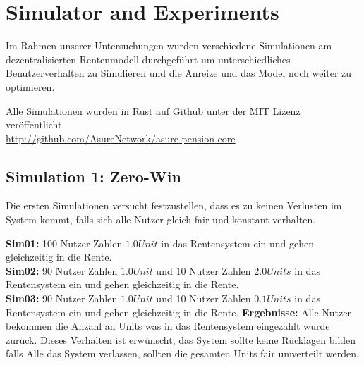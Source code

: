 \section{Simulator and Experiments}

Im Rahmen unserer Untersuchungen wurden verschiedene Simulationen am dezentralisierten Rentenmodell durchgeführt um unterschiedliches Benutzerverhalten zu Simulieren und die Anreize und das Model noch weiter zu optimieren.

Alle Simulationen wurden in Rust auf Github unter der MIT Lizenz veröffentlicht.\\
\url{http://github.com/AsureNetwork/asure-pension-core}

\subsection{Simulation 1: Zero-Win}

Die ersten Simulationen versucht festzustellen, dass es zu keinen Verlusten im System kommt, falls sich alle Nutzer gleich fair und konstant verhalten.

\textbf{Sim01:} 100 Nutzer Zahlen $1.0 Unit$ in das Rentensystem ein und gehen gleichzeitig in die Rente.\\
\textbf{Sim02:} 90 Nutzer Zahlen $1.0 Unit$ und 10 Nutzer Zahlen $2.0 Units$ in das Rentensystem ein und gehen gleichzeitig in die Rente.\\
\textbf{Sim03:} 90 Nutzer Zahlen $1.0 Unit$ und 10 Nutzer Zahlen $0.1 Units$ in das Rentensystem ein und gehen gleichzeitig in die Rente.
\newline \newline 
\textbf{Ergebnisse:} Alle Nutzer bekommen die Anzahl an Units was in das Rentensystem eingezahlt wurde zurück. Dieses Verhalten ist erwünscht, das System sollte keine Rücklagen bilden falls Alle das System verlassen, sollten die gesamten Units fair umverteilt werden.

\begin{table}[h!]
\centering
{}
\end{table}


